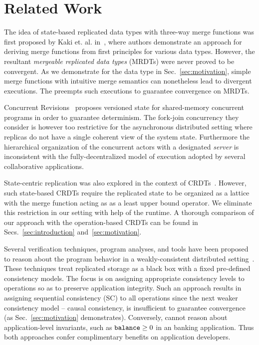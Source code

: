 \section{Related Work}
\label{sec:related}

The idea of state-based replicated data types with three-way merge
functions was first proposed by Kaki et. al. in~\cite{mrdt},
where authors demonstrate an approach for deriving merge functions
from first principles for various data types. However, the resultant
\emph{mergeable replicated data types} (MRDTs) were never proved to be
convergent. As we demonstrate for the  data type in
Sec.~\ref{sec:motivation}, simple merge functions with intuitive merge
semantics can nonetheless lead to divergent executions. The \quark
preempts such executions to guarantee convergence on MRDTs.

Concurrent Revisions~\cite{BBL+10} proposes versioned state for
shared-memory concurrent programs in order to guarantee determinism.
The fork-join concurrency they consider is however too restrictive for
the asynchronous distributed setting where replicas do not have a
single coherent view of the system state.  Furthermore the
hierarchical organization of the concurrent actors with a designated
\emph{server} is inconsistent with the fully-decentralized model of
execution adopted by several collaborative applications.

State-centric replication was also explored in the context of
CRDTs~\cite{crdts}. However, such state-based CRDTs require the
replicated state to be organized as a lattice with the merge function
acting as as a least upper bound operator. We eliminate this
restriction in our setting with help of the \quark runtime. A thorough
comparison of our approach with the operation-based CRDTs can be found
in Secs.~\ref{sec:introduction} and~\ref{sec:motivation}.

Several verification techniques, program analyses, and tools have been
proposed to reason about the program behavior in a weakly-consistent
distributed setting~\cite{bailis-vldb, alvaro-calm,
gotsman-popl16,redblue-atc, redblue-osdi, ecinec}. These techniques
treat replicated storage as a black box with a fixed pre-defined
consistency models. The focus is on assigning appropriate consistency
levels to operations so as to preserve application integrity. Such an
approach results in assigning sequential consistency (SC) to all
operations since the next weaker consistency model -- causal
consistency, is insufficient to guarantee convergence (as
Sec.~\ref{sec:motivation} demonstrates). Conversely, \quark cannot
reason about application-level invariants, such as ${\tt balance}\ge 0$
in an banking application. Thus both approaches confer complimentary
benefits on application developers.

